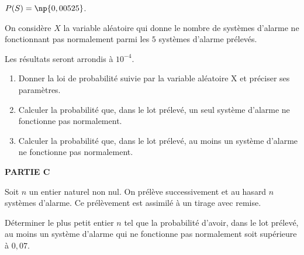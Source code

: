 $P(S) = \np{0,00525}$.

On considère $X$ la variable aléatoire qui donne le nombre de systèmes d'alarme ne fonctionnant pas normalement parmi les $5$ systèmes d'alarme prélevés.

Les résultats seront arrondis à $10^{-4}$.

\medskip

\begin{enumerate}
\item Donner la loi de probabilité suivie par la variable aléatoire X et préciser ses paramètres.
\item Calculer la probabilité que, dans le lot prélevé, un seul système d'alarme ne fonctionne pas normalement.
\item Calculer la probabilité que, dans le lot prélevé, au moins un système d'alarme ne fonctionne pas normalement.
\end{enumerate}

\medskip

\textbf{PARTIE C}

\medskip

Soit $n$ un entier naturel non nul. On prélève successivement et au hasard $n$ systèmes d'alarme. Ce prélèvement est assimilé à un tirage avec remise.

Déterminer le plus petit entier $n$ tel que la probabilité d'avoir, dans le lot prélevé, au moins un système d'alarme qui ne fonctionne pas normalement soit supérieure à $0,07$.

\bigskip
